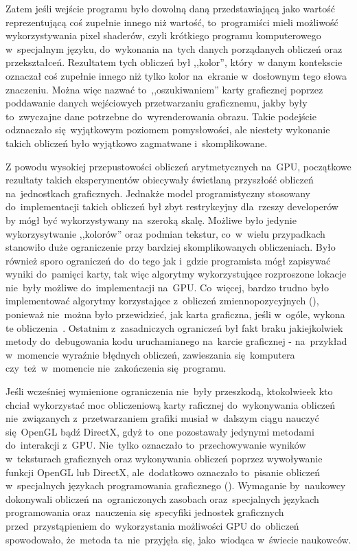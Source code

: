 Zatem jeśli wejście programu było dowolną daną przedstawiającą jako wartość reprezentującą coś zupełnie innego niż wartość, to~programiści mieli możliwość wykorzystywania pixel shaderów, czyli krótkiego programu komputerowego w~specjalnym języku, do~wykonania na~tych danych porządanych obliczeń oraz przekształceń. Rezultatem tych obliczeń był ,,kolor'', który~w danym kontekscie oznaczał coś zupełnie innego niż tylko kolor na~ekranie w~dosłownym tego słowa znaczeniu. Można więc nazwać to~,,oszukiwaniem'' karty graficznej poprzez poddawanie danych wejściowych przetwarzaniu graficznemu, jakby były to~zwyczajne dane potrzebne do~wyrenderowania obrazu. Takie podejście odznaczało się~wyjątkowym poziomem pomysłowości, ale niestety wykonanie takich obliczeń było wyjątkowo zagmatwane i~skomplikowane.

Z powodu wysokiej przepustowości obliczeń arytmetycznych na~GPU, początkowe rezultaty takich eksperymentów obiecywały świetlaną przyszłość obliczeń na~jednostkach graficznych. Jednakże model programistyczny stosowany do~implementacji takich obliczeń był zbyt restrykcyjny dla~rzeszy developerów by mógł być wykorzystywany na~szeroką skalę. Możliwe było jedynie wykorzysytwanie ,,kolorów'' oraz podmian tekstur, co~w~wielu przypadkach stanowiło duże ograniczenie przy bardziej skomplikowanych obliczeniach. Było również sporo ograniczeń do~do tego jak i~gdzie programista mógł zapisywać wyniki do~pamięci karty, tak więc algorytmy wykorzystujące rozproszone lokacje nie~były możliwe do~implementacji na~GPU. Co~więcej, bardzo trudno było implementować algorytmy korzystające z~obliczeń zmiennopozycyjnych (), ponieważ nie~można było przewidzieć, jak karta graficzna, jeśli w~ogóle, wykona te obliczenia~\cite{Cuda:Example}. Ostatnim z~zasadniczych ograniczeń był fakt braku jakiejkolwiek metody do~debugowania kodu uruchamianego na~karcie graficznej - na~przykład w~momencie wyraźnie błędnych obliczeń, zawieszania się~komputera czy~też~w~momencie nie~zakończenia się~programu.

Jeśli wcześniej wymienione ograniczenia nie~były przeszkodą, ktokolwieek kto chciał wykorzystać moc obliczeniową karty raficznej do~wykonywania obliczeń nie~związanych z~przetwarzaniem grafiki musiał w~dalszym ciągu nauczyć się~OpenGL bądź DirectX, gdyż to~one pozostawały jedynymi metodami do~interakcji z~GPU. Nie~tylko oznaczało to~przechowywanie wyników w~teksturach graficznych oraz wykonywania obliczeń poprzez wywoływanie funkcji OpenGL lub DirectX, ale~dodatkowo oznaczało to~pisanie obliczeń w~specjalnych językach programowania graficznego (). Wymaganie by~naukowcy dokonywali obliczeń na~ograniczonych zasobach oraz~specjalnych językach programowania oraz~nauczenia się~specyfiki jednostek graficznych przed~przystąpieniem do~wykorzystania możliwości GPU do~obliczeń spowodowało, że~metoda ta~nie~przyjęła się, jako~wiodąca w~świecie naukowców.


